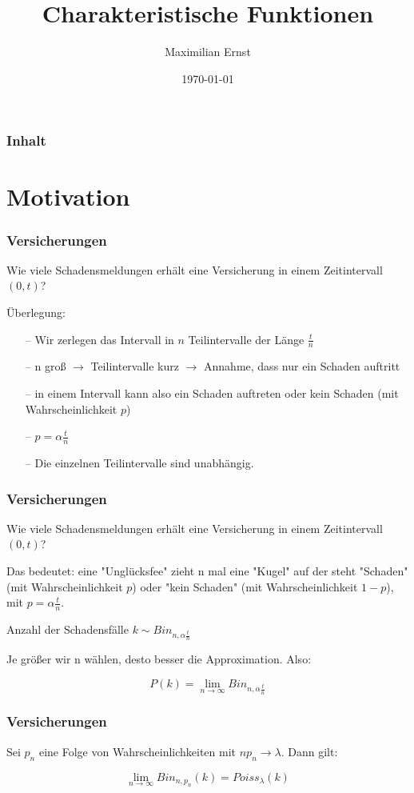 \documentclass{beamer}
\begin{document}
\title{Charakteristische Funktionen}
\author{Maximilian Ernst}
\date{\today}
\begin{frame}
\titlepage
\end{frame}

\begin{frame}\frametitle{Inhalt}\tableofcontents\end{frame}

\section{Motivation}
\begin{frame}
\frametitle{Versicherungen}
Wie viele Schadensmeldungen erhält eine Versicherung in einem Zeitintervall $(0, t)$?

Überlegung:
\hfill \newline
\begin{itemize}
    \item[--] Wir zerlegen das Intervall in $n$ Teilintervalle der Länge $\frac{t}{n}$
    \item[--] n groß $\to$ Teilintervalle kurz $\to$ Annahme, dass nur ein Schaden auftritt
    \item[--] in einem Intervall kann also ein Schaden auftreten oder kein Schaden (mit Wahrscheinlichkeit $p$)
    \item[--] $p = \alpha \frac{t}{n}$
    \item[--] Die einzelnen Teilintervalle sind unabhängig.
\end{itemize}
\end{frame}

\begin{frame}
\frametitle{Versicherungen}
Wie viele Schadensmeldungen erhält eine Versicherung in einem Zeitintervall $(0, t)$?

Das bedeutet: eine "Unglücksfee" zieht n mal eine "Kugel" auf der steht "Schaden" (mit Wahrscheinlichkeit $p$) oder "kein Schaden" (mit Wahrscheinlichkeit $1-p$), mit $p = \alpha \frac{t}{n}$.

Anzahl der Schadensfälle $k \sim Bin_{n, \alpha \frac{t}{n}}$

Je größer wir n wählen, desto besser die Approximation. Also:

$$P(k) = \lim_{n \to \infty} Bin_{n, \alpha \frac{t}{n}}$$
\end{frame}

\begin{frame}
\frametitle{Versicherungen}
Sei $p_n$ eine Folge von Wahrscheinlichkeiten mit $n p_n \to \lambda$. Dann gilt:

$$\lim_{n \to \infty} Bin_{n, p_n}(k) = Poiss_\lambda (k)$$
\end{frame}
\end{document}

